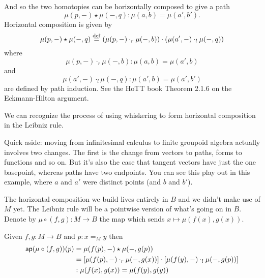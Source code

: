 \begin{center}
\end{center}

And so the two homotopies can be horizontally composed to give a path \[ \mu(p,-)\star\mu(-,q): \mu(a, b)=\mu(a',b'). \] Horizontal composition is given by \[\mu(p,-)\star\mu(-,q)\stackrel{\mathrm{def}}{=}(\mu(p,-)\cdot_r \mu(-,b))\cdot(\mu(a', -)\cdot_l\mu(-, q))\] where \[ \mu(p,-)\cdot_r\mu(-,b):\mu(a,b)=\mu(a',b) \] and \[ \mu(a',-)\cdot_l\mu(-,q):\mu(a',b)=\mu(a',b') \] are defined by path induction.  See the HoTT book Theorem 2.1.6 on the Eckmann-Hilton argument\cite{hottbook}.

We can recognize the process of using whiskering to form horizontal composition in the Leibniz rule. 

Quick aside: moving from infinitesimal calculus to finite groupoid algebra actually involves two changes. The first is the change from vectors to paths, forms to functions and so on. But it's also the case that tangent vectors have just the one basepoint, whereas paths have two endpoints. You can see this play out in this example, where \( a \) and \( a' \) were distinct points (and \( b \) and \( b' \)).

The horizontal composition we build lives entirely in \( B \) and we didn't make use of \( M \) yet. The Leibniz rule will be a pointwise version of what's going on in \( B \). Denote by \( \mu\circ(f,g):M\to B \) the map which sends \( x\mapsto \mu(f(x),g(x)) \).

\begin{mylemma}
Given \( f, g:M\to B \) and \( p:x=_M y \) then 
\begin{align*}
 \mathsf{ap}(\mu\circ(f,g))(p)&=\mu(f(p),-)\star\mu(-,g(p))\\
 &=\left[\mu(f(p),-)\cdot_r \mu(-,g(x))\right]\cdot \left[\mu(f(y),-)\cdot_l\mu(-,g(p))\right]\\
 &:\mu(f(x),g(x))=\mu(f(y),g(y))
\end{align*}
\end{mylemma}

